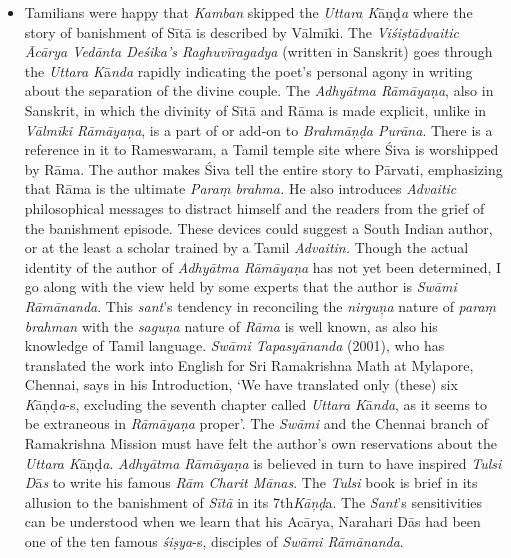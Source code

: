 \begin{itemize}
\item Tamilians were happy that \textit{Kamban} skipped the \textit{Uttara K}āņḍ\textit{a} where the story of banishment of Sītā is described by Vālmīki. The \textit{Viśiṣtādvaitic Ācārya Vedānta Deśika’s Raghuvīragadya} (written in Sanskrit) goes through the \textit{Uttara K}ā\textit{nda} rapidly indicating the poet’s personal agony in writing about the separation of the divine couple. The \textit{Adhyātma Rāmāyaṇa}, also in Sanskrit, in which the divinity of Sītā and Rāma is made explicit, unlike in \textit{Vālmīki Rāmāyaṇa}, is a part of or add-on to\textit{ Brahmāņḍa Purāna}. There is a reference in it to Rameswaram, a Tamil temple site where Śiva is worshipped by Rāma. The author makes Śiva tell the entire story to Pārvati, emphasizing that Rāma is the ultimate \textit{Paraṃ brahma.} He also introduces \textit{Advaitic} philosophical messages to distract himself and the readers from the grief of the banishment episode. These devices could suggest a South Indian author, or at the least a scholar trained by a Tamil \textit{Advaitin.} Though the actual identity of the author of \textit{Adhyātma Rāmāyaṇa} has not yet been determined, I go along with the view held by some experts that the author is \textit{Swāmi Rāmānanda}. This \textit{sant}’s tendency in reconciling the \textit{nirguņa} nature of \textit{paraṃ brahman} with the \textit{saguņa} nature of \textit{Rāma} is well known, as also his knowledge of Tamil language. \textit{Swāmi Tapasyānanda} (2001), who has translated the work into English for Sri Ramakrishna Math at Mylapore, Chennai, says in his Introduction, ‘We have translated only (these) six \textit{K}āņḍ\textit{a}-s, excluding the seventh chapter called \textit{Uttara K}ā\textit{nda}, as it seems to be extraneous in \textit{Rāmāyaṇa} proper’. The \textit{Swāmi} and the Chennai branch of Ramakrishna Mission must have felt the author’s own reservations about the \textit{Uttara K}āņḍ\textit{a}. \textit{Adhyātma Rāmāyaṇa} is believed in turn to have inspired \textit{Tulsi D}ā\textit{s} to write his famous \textit{Rām Charit Mānas}. The \textit{Tulsi} book is brief in its allusion to the banishment of \textit{Sītā} in its 7th\textit{Kāņḍ}a. The \textit{Sant}’s sensitivities can be understood when we learn that his Acārya, Narahari Dās had been one of the ten famous \textit{śiṣya}-s, disciples of \textit{Swāmi Rāmānanda}.

\end{itemize}


